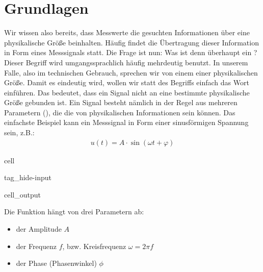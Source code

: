 \documentclass[letterpaper,10pt,english]{jupyterBook}
\begin{document}
\section{Grundlagen}
\label{\detokenize{content/3_basics:grundlagen}}\label{\detokenize{content/3_basics::doc}}
\sphinxAtStartPar
Wir wissen also bereits, dass Messwerte die gesuchten Informationen über eine physikalische Größe beinhalten. Häufig findet die Übertragung dieser Information in Form eines Messsignals statt. Die Frage ist nun: Was ist denn überhaupt ein ? Dieser Begriff wird umgangssprachlich häufig mehrdeutig benutzt. In unserem Falle, also im technischen Gebrauch, sprechen wir von einem  einer physikalischen Größe. Damit es eindeutig wird, wollen wir statt des Begriffs  einfach das Wort  einführen. Das bedeutet, dass ein Signal nicht an eine bestimmte physikalische Größe gebunden ist. Ein Signal besteht nämlich in der Regel aus mehreren Parametern (), die die  von physikalischen Informationen sein können. Das einfachste Beispiel kann ein Messsignal in Form einer sinusförmigen Spannung sein, z.B.:
\begin{equation*}
\begin{split}u(t) = A \cdot \sin(\omega t + \varphi)\end{split}
\end{equation*}
\begin{sphinxuseclass}{cell}
\begin{sphinxuseclass}{tag_hide-input}\begin{sphinxVerbatimOutput}

\begin{sphinxuseclass}{cell_output}
\noindent{}

\end{sphinxuseclass}\end{sphinxVerbatimOutput}

\end{sphinxuseclass}
\end{sphinxuseclass}
\sphinxAtStartPar
Die Funktion hängt von drei Parametern ab:
\begin{itemize}
\item {} 
\sphinxAtStartPar
der Amplitude \(A\)

\item {} 
\sphinxAtStartPar
der Frequenz \(f\), bzw. Kreisfrequenz \(\omega = 2\pi f\)

\item {} 
\sphinxAtStartPar
der Phase (Phasenwinkel) \(\phi\)

\end{itemize}
\end{document}
